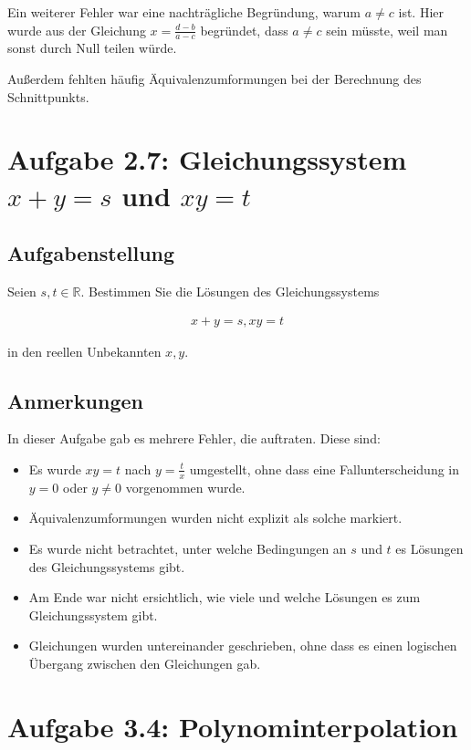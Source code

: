 \documentclass[a4paper]{article}
\newcommand*{\R}{\mathbb R}
\begin{document}
Ein weiterer Fehler war eine nachträgliche Begründung, warum $a\neq c$ ist. Hier wurde aus der Gleichung $x=\frac{d-b}{a-c}$ begründet, dass $a\neq c$ sein müsste, weil man sonst durch Null teilen würde.

Außerdem fehlten häufig Äquivalenzumformungen bei der Berechnung des Schnittpunkts.

\section{Aufgabe 2.7: Gleichungssystem $x+y=s$ und $xy=t$}

\subsection{Aufgabenstellung}

Seien $s,t\in\R$. Bestimmen Sie die Lösungen des Gleichungssystems

\begin{align}
  x+y=s,xy=t
\end{align}

in den reellen Unbekannten $x,y$.

\subsection{Anmerkungen}

In dieser Aufgabe gab es mehrere Fehler, die auftraten. Diese sind:

\begin{itemize}
  \item Es wurde $xy=t$ nach $y=\frac tx$ umgestellt, ohne dass eine Fallunterscheidung in $y=0$ oder $y\neq 0$ vorgenommen wurde.
  \item Äquivalenzumformungen wurden nicht explizit als solche markiert.
  \item Es wurde nicht betrachtet, unter welche Bedingungen an $s$ und $t$ es Lösungen des Gleichungssystems gibt.
  \item Am Ende war nicht ersichtlich, wie viele und welche Lösungen es zum Gleichungssystem gibt.
  \item Gleichungen wurden untereinander geschrieben, ohne dass es einen logischen Übergang zwischen den Gleichungen gab.
\end{itemize}

\section{Aufgabe 3.4: Polynominterpolation}
\end{document}
